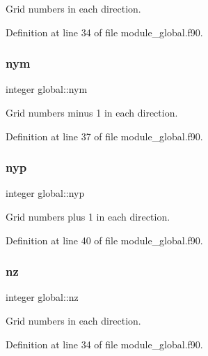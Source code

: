 Grid numbers in each direction. 



Definition at line 34 of file module\+\_\+global.\+f90.

\mbox{\label{namespaceglobal_a9852876e90514ccc182c0ed0b27cdaad}} 
\subsubsection{\texorpdfstring{nym}{nym}}
{\footnotesize\ttfamily integer global\+::nym}



Grid numbers minus 1 in each direction. 



Definition at line 37 of file module\+\_\+global.\+f90.

\mbox{\label{namespaceglobal_a868bbe46b97daa7ff6c962fff16bbf2f}} 
\subsubsection{\texorpdfstring{nyp}{nyp}}
{\footnotesize\ttfamily integer global\+::nyp}



Grid numbers plus 1 in each direction. 



Definition at line 40 of file module\+\_\+global.\+f90.

\mbox{\label{namespaceglobal_ab8d7436a6037d4c1b7248107a2f07d76}} 
\subsubsection{\texorpdfstring{nz}{nz}}
{\footnotesize\ttfamily integer global\+::nz}



Grid numbers in each direction. 



Definition at line 34 of file module\+\_\+global.\+f90.

\mbox{\label{namespaceglobal_a76e27e2001870f6606e51d33a2c70f60}} 
